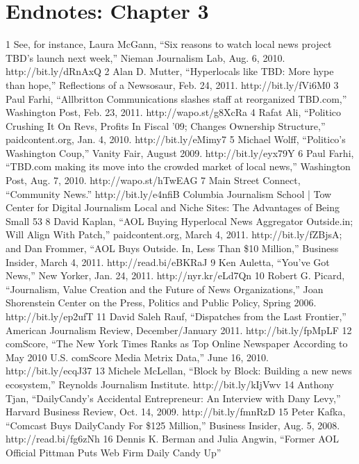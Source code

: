 \section{Endnotes: Chapter 3}
1 See, for instance, Laura McGann, ``Six reasons to watch local news project TBD's launch next
week,'' Nieman Journalism Lab, Aug. 6, 2010. http://bit.ly/dRnAxQ
2 Alan D. Mutter, ``Hyperlocals like TBD: More hype than hope,'' Reflections of a Newsosaur,
Feb. 24, 2011. http://bit.ly/fVi6M0
3 Paul Farhi, ``Allbritton Communications slashes staff at reorganized TBD.com,'' Washington
Post, Feb. 23, 2011. http://wapo.st/g8XcRa
4 Rafat Ali, ``Politico Crushing It On Revs, Profits In Fiscal '09; Changes Ownership Structure,''
paidcontent.org, Jan. 4, 2010. http://bit.ly/eMimy7
5 Michael Wolff, ``Politico's Washington Coup,'' Vanity Fair, August 2009. http://bit.ly/eyx79Y
6 Paul Farhi, ``TBD.com making its move into the crowded market of local news,'' Washington
Post, Aug. 7, 2010. http://wapo.st/hTwEAG
7 Main Street Connect, ``Community News.'' http://bit.ly/e4nfiB
Columbia Journalism School | Tow Center for Digital Journalism
Local and Niche Sites: The Advantages of Being Small 53
8 David Kaplan, ``AOL Buying Hyperlocal News Aggregator Outside.in; Will Align With Patch,''
paidcontent.org, March 4, 2011. http://bit.ly/fZBjsA; and Dan Frommer, ``AOL Buys Outside.
In, Less Than \$10 Million,'' Business Insider, March 4, 2011. http://read.bi/eBKRaJ
9 Ken Auletta, ``You've Got News,'' New Yorker, Jan. 24, 2011. http://nyr.kr/eLd7Qn
10 Robert G. Picard, ``Journalism, Value Creation and the Future of News Organizations,'' Joan
Shorenstein Center on the Press, Politics and Public Policy, Spring 2006. http://bit.ly/ep2ufT
11 David Saleh Rauf, ``Dispatches from the Last Frontier,'' American Journalism Review,
December/January 2011. http://bit.ly/fpMpLF
12 comScore, ``The New York Times Ranks as Top Online Newspaper According to May 2010
U.S. comScore Media Metrix Data,'' June 16, 2010. http://bit.ly/ecqJ37
13 Michele McLellan, ``Block by Block: Building a new news ecosystem,'' Reynolds Journalism
Institute. http://bit.ly/kIjVwv
14 Anthony Tjan, ``DailyCandy's Accidental Entrepreneur: An Interview with Dany Levy,''
Harvard Business Review, Oct. 14, 2009. http://bit.ly/fmnRzD
15 Peter Kafka, ``Comcast Buys DailyCandy For \$125 Million,'' Business Insider, Aug. 5, 2008.
http://read.bi/fg6zNh
16 Dennis K. Berman and Julia Angwin, ``Former AOL Official Pittman Puts Web Firm Daily
Candy Up''


